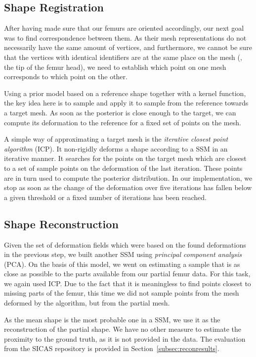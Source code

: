 
\subsection{Shape Registration}
\label{subsec:registr}

After having made sure that our femurs are oriented accordingly, our next goal was to find correspondence between them.
As their mesh representations do not necessarily have the same amount of vertices, and furthermore, we cannot be sure that the vertices with identical identifiers are at the same place on the mesh (\eg, the tip of the femur head), we need to establish which point on one mesh corresponds to which point on the other.

Using a prior model based on a reference shape together with a kernel function, the key idea here is to sample and apply it to sample from the reference towards a target mesh.
As soon as the posterior is close enough to the target, we can compute its deformation to the reference for a fixed set of points on the mesh.

A simple way of approximating a target mesh is the \emph{iterative closest point algorithm} (ICP).
It non-rigidly deforms a shape according to a SSM in an iterative manner.
It searches for the points on the target mesh which are closest to a set of sample points on the deformation of the last iteration.
These points are in turn used to compute the posterior distribution.
In our implementation, we stop as soon as the change of the deformation over five iterations has fallen below a given threshold or a fixed number of iterations has been reached.


\subsection{Shape Reconstruction}
\label{subsec:recon}

Given the set of deformation fields which were based on the found deformations in the previous step, we built another SSM using \emph{principal component analysis} (PCA).
On the basis of this model, we went on estimating a sample that is as close as possible to the parts available from our partial femur data.
For this task, we again used ICP.
Due to the fact that it is meaningless to find points closest to missing parts of the femur, this time we did not sample points from the mesh deformed by the algorithm, but from the partial mesh.

As the mean shape is the most probable one in a SSM, we use it as the reconstruction of the partial shape.
We have no other measure to estimate the proximity to the ground truth, as it is not provided in the data.
The evaluation from the SICAS repository is provided in Section~\ref{subsec:reconresults}.
